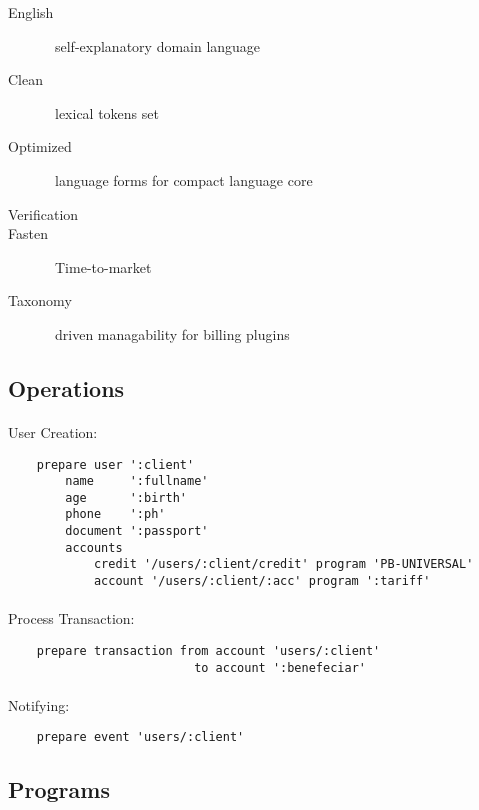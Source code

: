 \begin{description}
     \item[English]~self-explanatory domain language
     \item[Clean]~lexical tokens set
     \item[Optimized]~language forms for compact language core
     \item[Verification]
     \item[Fasten]~Time-to-market
     \item[Taxonomy]~driven managability for billing plugins
\end{description}

\subsection{Operations}

\paragraph{}User Creation:

\begin{lstlisting}
    prepare user ':client' 
        name     ':fullname'
        age      ':birth'
        phone    ':ph'
        document ':passport'
        accounts 
            credit '/users/:client/credit' program 'PB-UNIVERSAL'
            account '/users/:client/:acc' program ':tariff'
\end{lstlisting}

\paragraph{}Process Transaction:

\begin{lstlisting}
    prepare transaction from account 'users/:client' 
                          to account ':benefeciar'
\end{lstlisting}

\paragraph{}Notifying:

\begin{lstlisting}
    prepare event 'users/:client'
\end{lstlisting}

\newpage
\subsection{Programs}

